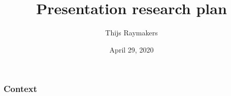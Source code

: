 \documentclass{beamer}
\author{Thijs Raymakers}
\title{Presentation research plan}
\date{April 29, 2020}
\begin{document}
\begin{frame}
\frametitle{Context}
\end{frame}
\end{document}
